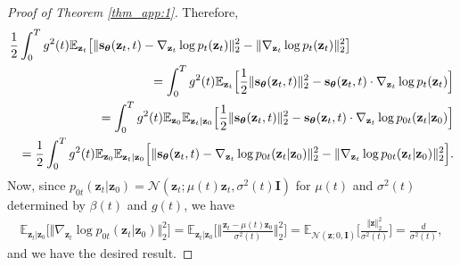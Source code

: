 \documentclass{article}
\theoremstyle{definition}
\theoremstyle{remark}
\begin{document}
\begin{proof}[Proof of Theorem \ref{thm_app:1}]
		Therefore,
		\begin{eqnarray*}
			\lefteqn{\frac{1}{2}\int_{0}^{T}g^{2}(t)\mathbb{E}_{\mathbf{z}_{t}}\big[\Vert\mathbf{s}_{\bm{\theta}}(\mathbf{z}_{t},t)-\nabla_{\mathbf{z}_{t}}\log{p_{t}(\mathbf{z}_{t})}\Vert_{2}^{2}-\Vert\nabla_{\mathbf{z}_{t}}\log{p_{t}(\mathbf{z}_{t})}\Vert_{2}^{2}\big]}\\
			&&=\int_{0}^{T}g^{2}(t)\mathbb{E}_{\mathbf{z}_{t}}\Big[\frac{1}{2}\Vert\mathbf{s}_{\bm{\theta}}(\mathbf{z}_{t},t)\Vert_{2}^{2}-\mathbf{s}_{\bm{\theta}}(\mathbf{z}_{t},t)\cdot\nabla_{\mathbf{z}_{t}}\log{p_{t}(\mathbf{z}_{t})}\Big]\\
			&&=\int_{0}^{T}g^{2}(t)\mathbb{E}_{\mathbf{z}_{0}}\mathbb{E}_{\mathbf{z}_{t}\vert\mathbf{z}_{0}}\Big[\frac{1}{2}\Vert\mathbf{s}_{\bm{\theta}}(\mathbf{z}_{t},t)\Vert_{2}^{2}-\mathbf{s}_{\bm{\theta}}(\mathbf{z}_{t},t)\cdot\nabla_{\mathbf{z}_{t}}\log{p_{0t}(\mathbf{z}_{t}\vert\mathbf{z}_{0})}\Big]\\
			&&=\frac{1}{2}\int_{0}^{T}g^{2}(t)\mathbb{E}_{\mathbf{z}_{0}}\mathbb{E}_{\mathbf{z}_{t}\vert\mathbf{z}_{0}}\Big[\Vert\mathbf{s}_{\bm{\theta}}(\mathbf{z}_{t},t)-\nabla_{\mathbf{z}_{t}}\log{p_{0t}(\mathbf{z}_{t}\vert\mathbf{z}_{0})}\Vert_{2}^{2}-\Vert\nabla_{\mathbf{z}_{t}}\log{p_{0t}(\mathbf{z}_{t}\vert\mathbf{z}_{0})}\Vert_{2}^{2}\Big].
		\end{eqnarray*}
		Now, since $p_{0t}(\mathbf{z}_{t}\vert\mathbf{z}_{0})=\mathcal{N}(\mathbf{z}_{t};\mu(t)\mathbf{z}_{t},\sigma^{2}(t)\mathbf{I})$ for $\mu(t)$ and $\sigma^{2}(t)$ determined by $\beta(t)$ and $g(t)$, we have
		\begin{align*}
		\mathbb{E}_{\mathbf{z}_{t}\vert\mathbf{z}_{0}}\big[\Vert\nabla_{\mathbf{z}_{t}}\log{p_{0t}(\mathbf{z}_{t}\vert\mathbf{z}_{0})}\Vert_{2}^{2}\big]=\mathbb{E}_{\mathbf{z}_{t}\vert\mathbf{z}_{0}}\Big[\Big\Vert\frac{\mathbf{z}_{t}-\mu(t)\mathbf{z}_{0}}{\sigma^{2}(t)}\Big\Vert_{2}^{2}\Big]=\mathbb{E}_{\mathcal{N}(\mathbf{z};0,\mathbf{I})}\Big[\frac{\Vert\mathbf{z}\Vert_{2}^{2}}{\sigma^{2}(t)}\Big]=\frac{d}{\sigma^{2}(t)},
		\end{align*}
		and we have the desired result.
	\end{proof}
	
\end{document}
